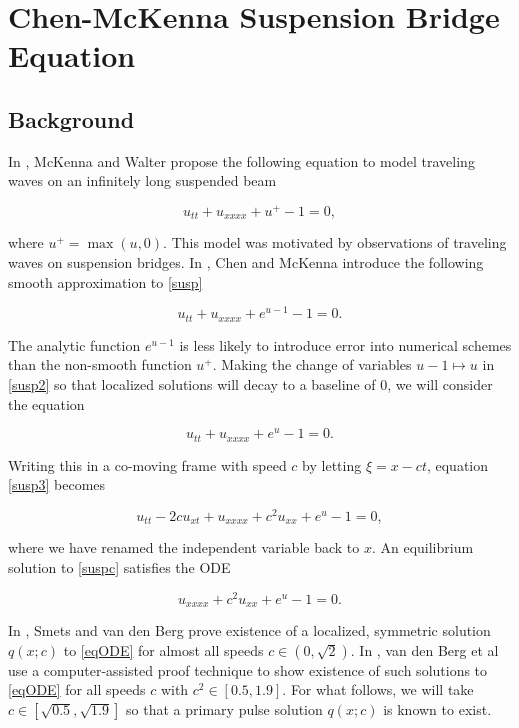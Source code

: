 \documentclass[12pt]{article}
\begin{document}
\section{Chen-McKenna Suspension Bridge Equation}

\subsection{Background}

In \cite{McKenna1990}, McKenna and Walter propose the following equation to model traveling waves on an infinitely long suspended beam

\begin{equation}\label{susp}
u_{tt} + u_{xxxx} + u^+ - 1 = 0,
\end{equation}

where $u^+ = \max(u, 0)$. This model was motivated by observations of traveling waves on suspension bridges. In \cite{Chen1997}, Chen and McKenna introduce the following smooth approximation to \eqref{susp}

\begin{equation}\label{susp2}
u_{tt} + u_{xxxx} + e^{u-1} - 1 = 0.
\end{equation}

The analytic function $e^{u-1}$ is less likely to introduce error into numerical schemes than the non-smooth function $u^+$. Making the change of variables $u - 1 \mapsto u$ in \eqref{susp2} so that localized solutions will decay to a baseline of 0, we will consider the equation

\begin{equation}\label{susp3}
u_{tt} + u_{xxxx} + e^{u} - 1 = 0.
\end{equation}

Writing this in a co-moving frame with speed $c$ by letting $\xi = x - ct$, equation \eqref{susp3} becomes

\begin{equation}\label{suspc}
u_{tt} - 2 c u_{x t} + u_{xxxx} + c^2 u_{xx} + e^{u} - 1 = 0,
\end{equation}

where we have renamed the independent variable back to $x$. An equilibrium solution to \eqref{suspc} satisfies the ODE

\begin{equation}\label{eqODE}
u_{xxxx} + c^2 u_{xx} + e^{u} - 1 = 0.
\end{equation}

In \cite[Theorem 11]{Smets2002}, Smets and van den Berg prove existence of a localized, symmetric solution $q(x; c)$ to \eqref{eqODE} for almost all speeds $c \in (0, \sqrt{2})$. In \cite[Theorem 1]{Berg2018}, van den Berg et al use a computer-assisted proof technique to show existence of such solutions to \eqref{eqODE} for all speeds $c$ with $c^2 \in [0.5, 1.9]$. For what follows, we will take $c \in [\sqrt{0.5}, \sqrt{1.9}]$ so that a primary pulse solution $q(x; c)$ is known to exist. \\
\end{document}
